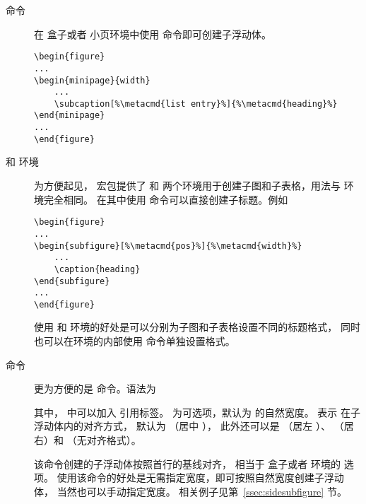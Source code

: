 \begin{description}
	\item[ 命令] 在  盒子或者  小页环境中使用  命令即可创建子浮动体。
\begin{lstlisting}[escapechar=\%]
\begin{figure}
...
\begin{minipage}{width}
	...
	\subcaption[%\metacmd{list entry}%]{%\metacmd{heading}%}
\end{minipage}
...
\end{figure}
\end{lstlisting}
	\item[ 和  环境] 
	为方便起见， 宏包提供了  和  两个环境用于创建子图和子表格，用法与  环境完全相同。
	在其中使用  命令可以直接创建子标题。例如
\begin{lstlisting}[escapechar=\%]
\begin{figure}
...
\begin{subfigure}[%\metacmd{pos}%]{%\metacmd{width}%}
	...
	\caption{heading}
\end{subfigure}
...
\end{figure}
\end{lstlisting}
	使用  和  环境的好处是可以分别为子图和子表格设置不同的标题格式，
	同时也可以在环境的内部使用  命令单独设置格式。
	
	\item[ 命令] 
	更为方便的是  命令。语法为
\begin{center}
\end{center}
	其中， 中可以加入  引用标签。
	 为可选项，默认为  的自然宽度。
	表示 在子浮动体内的对齐方式，
	默认为  （居中 ），
	此外还可以是  （居左 ）、
	 （居右）和  （无对齐格式）。
	
	该命令创建的子浮动体按照首行的基线对齐，
	相当于  盒子或者  环境的 \opt{[t]} 选项。
	使用该命令的好处是无需指定宽度，即可按照自然宽度创建子浮动体，
	当然也可以手动指定宽度。
	相关例子见第~\ref{ssec:sidesubfigure} 节。
\end{description}


